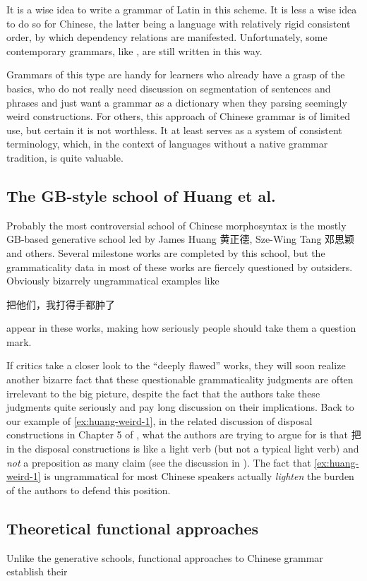 It is a wise idea to write a grammar of Latin in this scheme. It is less a wise idea to do so for Chinese,
the latter being a language with relatively rigid consistent order, by which dependency relations 
are manifested. Unfortunately, some contemporary grammars, like \citet{po2015chinese}, are still 
written in this way. %

Grammars of this type are handy for learners who already have a grasp of the basics, who do not really need 
discussion on segmentation of sentences and phrases and just want a grammar as a dictionary when they 
parsing seemingly weird constructions. For others, this approach of Chinese grammar is of limited use,
but certain it is not worthless. It at least serves as a system of consistent terminology, which, in 
the context of languages without a native grammar tradition, is quite valuable.

\subsection{The GB-style school of Huang et al.}

Probably the most controversial school of Chinese morphosyntax is the mostly GB-based generative school led by James Huang 黄正德, 
Sze-Wing Tang 邓思颖 and others. Several milestone works are completed by this school, but the grammaticality 
data in most of these works are fiercely questioned by outsiders. Obviously bizarrely ungrammatical examples 
like \citep[sec. 5.4.2, (65)]{huang2013} 
\begin{exe}
    \ex\label{ex:huang-weird-1} 把他们，我打得手都肿了
\end{exe}
appear in these works, making how seriously people should take them a question mark.

If critics take a closer look to the ``deeply flawed'' works, they will soon realize another bizarre fact that 
these questionable grammaticality judgments are often irrelevant to the big picture, despite the fact that 
the authors take these judgments quite seriously and pay long discussion on their implications.
Back to our example of \eqref{ex:huang-weird-1}, in the related discussion of disposal constructions in 
Chapter 5 of \citet{huang2013}, what the authors are trying to argue for is that 把 in the disposal constructions 
is like a light verb (but not a typical light verb) and \emph{not} a preposition as many claim 
(see the discussion in ). The fact that \eqref{ex:huang-weird-1} is ungrammatical 
for most Chinese speakers actually \emph{lighten} the burden of the authors to defend this position.

\subsection{Theoretical functional approaches}

Unlike the generative schools, functional approaches to Chinese grammar establish their 

